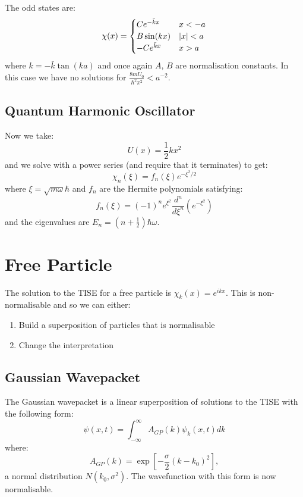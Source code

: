 \documentclass[../Main.tex]{subfiles}
\begin{document}
The odd states are:
\begin{equation*}
    \chi(x) =
    \begin{cases}
        Ce^{-\bar{k}x} & x < -a \\
        B\sin(kx) & \lvert x\rvert < a \\
        -Ce^{\bar{k}x} & x > a
    \end{cases}
\end{equation*}
where $k = -\bar{k} \tan(ka)$ and once again $A$, $B$ are normalisation constants. In this case we have no solutions for $\frac{8mU_0}{\hbar^2 \pi^2} < a^{-2}$.
\subsection{Quantum Harmonic Oscillator}
Now we take:
\begin{equation*}
    U(x) = \frac12kx^2
\end{equation*}
and we solve with a power series (and require that it terminates) to get:
\begin{equation*}
    \chi_n(\xi) = f_n(\xi) e^{-\xi^2 / 2}
\end{equation*}
where $\xi = \sqrt{m\omega}{\hbar}$ and $f_n$ are the Hermite polynomials satisfying:
\begin{equation*}
    f_n(\xi) = (-1)^n e^{\xi^2} \frac{d^{n}}{d\xi^{n}}\left(e^{-\xi^2}\right)
\end{equation*}
and the eigenvalues are $E_n = \left(n + \frac12\right)\hbar\omega$.
\section{Free Particle}
The solution to the TISE for a free particle is $\chi_k(x) = e^{ikx}$. This is non-normalisable and so we can either:
\begin{enumerate}
    \item Build a superposition of particles that is normalisable
    \item Change the interpretation
\end{enumerate}
\subsection{Gaussian Wavepacket}
The Gaussian wavepacket is a linear superposition of solutions to the TISE with the following form:
\begin{equation*}
    \psi(x, t) = \int_{-\infty}^{\infty} A_{GP}(k) \psi_k(x, t) dk
\end{equation*}
where:
\begin{equation*}
    A_{GP}(k) = \exp\left[-\frac{\sigma}{2}(k - k_0)^2\right],
\end{equation*}
a normal distribution $N(k_0, \sigma^2)$. The wavefunction with this form is now normalisable.
\end{document}
